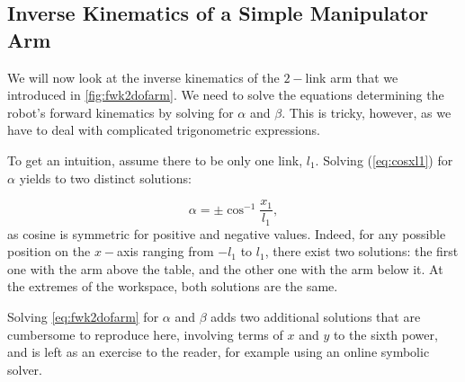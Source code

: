 \subsection{Inverse Kinematics of a Simple Manipulator Arm}\label{sec:kinematics:inverse:arm}

We will now look at the inverse kinematics of the $2-$link arm that we introduced in \cref{fig:fwk2dofarm}. We need to solve the equations determining the robot's forward kinematics by solving for $\alpha$ and $ \beta$.
This is tricky, however, as we have to deal with complicated trigonometric expressions.

To get an intuition, assume there to be only one link, $l_1$.  Solving (\ref{eq:cosxl1}) for $\alpha$ yields to two distinct solutions:

\begin{equation}
\alpha = \pm \cos^{-1}\frac{x_1}{l_1},
\end{equation}
as cosine is symmetric for positive and negative values.
Indeed, for any possible position on the $x-$axis ranging from $-l_1$ to $l_1$, there exist two solutions: the first one with the arm above the table, and the other one with the arm below it.
At the extremes of the workspace, both solutions are the same.


Solving \ref{eq:fwk2dofarm} for $\alpha$ and $\beta$ adds two additional solutions that are cumbersome to reproduce here, involving terms of $x$ and $y$ to the sixth power, and is left as an exercise to the reader, for example using an online symbolic solver. 


